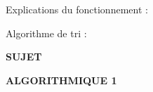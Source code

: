 \documentclass[11pt,a4paper]{article}
\newcommand{\TitreMatiere}{Algorithmique 1}
\begin{document}
\vfillFirst

\begin{center}
Explications du fonctionnement :

\medskip

Algorithme de tri :
\end{center}

\vfillLast

\newpage




\vfillFirst

\begin{center}

\begin{LARGE}
\textbf{SUJET}

\bigskip

\textbf{\MakeUppercase{\TitreMatiere}}
\end{LARGE}

\end{center}

\vfillLast
\end{document}
